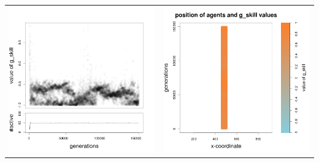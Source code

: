 \documentclass[a4paper,10pt]{article}
\begin{document}
\begin{table}[H]
\begin{tabular}{cc}
 \includegraphics[width=\imgSize]{../images/5StaticEnv/Gplot62_staticEnv0}&\includegraphics[width=\imgSize]{../images/5StaticEnv/Gplot62Static_staticEnv0}\\

\end{tabular}
\end{table}
\end{document}
